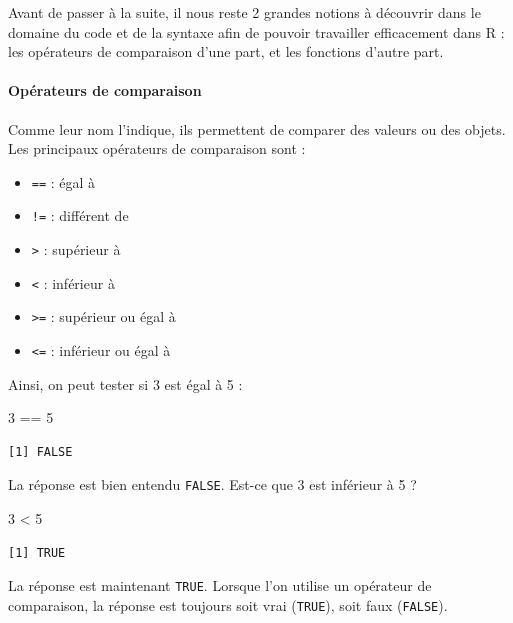 \documentclass[
  a4paper,
]{article}
\newenvironment{Shaded}{\begin{snugshade}}{\end{snugshade}}
\newcommand{\DecValTok}[1]{\textcolor[rgb]{0.69,0.50,0.00}{#1}}
\newcommand{\OperatorTok}[1]{\textcolor[rgb]{0.12,0.11,0.11}{#1}}
\newcommand{\StringTok}[1]{\textcolor[rgb]{0.75,0.01,0.01}{#1}}
\providecommand{\tightlist}{%
  \setlength{\itemsep}{0pt}\setlength{\parskip}{0pt}}
\begin{document}
Avant de passer à la suite, il nous reste 2 grandes notions à découvrir dans le domaine du code et de la syntaxe afin de pouvoir travailler efficacement dans R : les opérateurs de comparaison d'une part, et les fonctions d'autre part.

\hypertarget{comparaison}{%
\paragraph{Opérateurs de comparaison}\label{comparaison}}

Comme leur nom l'indique, ils permettent de comparer des valeurs ou des objets. Les principaux opérateurs de comparaison sont :

\begin{itemize}
\tightlist
\item
  \texttt{==} : égal à
\item
  \texttt{!=} : différent de
\item
  \texttt{\textgreater{}} : supérieur à
\item
  \texttt{\textless{}} : inférieur à
\item
  \texttt{\textgreater{}=} : supérieur ou égal à
\item
  \texttt{\textless{}=} : inférieur ou égal à
\end{itemize}

Ainsi, on peut tester si 3 est égal à 5 :

\begin{Shaded}
\begin{Highlighting}[]
\DecValTok{3} \OperatorTok{==}\StringTok{ }\DecValTok{5}
\end{Highlighting}
\end{Shaded}

\begin{verbatim}
[1] FALSE
\end{verbatim}

La réponse est bien entendu \texttt{FALSE}. Est-ce que 3 est inférieur à 5 ?

\begin{Shaded}
\begin{Highlighting}[]
\DecValTok{3} \OperatorTok{<}\StringTok{ }\DecValTok{5}
\end{Highlighting}
\end{Shaded}

\begin{verbatim}
[1] TRUE
\end{verbatim}

La réponse est maintenant \texttt{TRUE}. Lorsque l'on utilise un opérateur de comparaison, la réponse est toujours soit vrai (\texttt{TRUE}), soit faux (\texttt{FALSE}).
\end{document}
